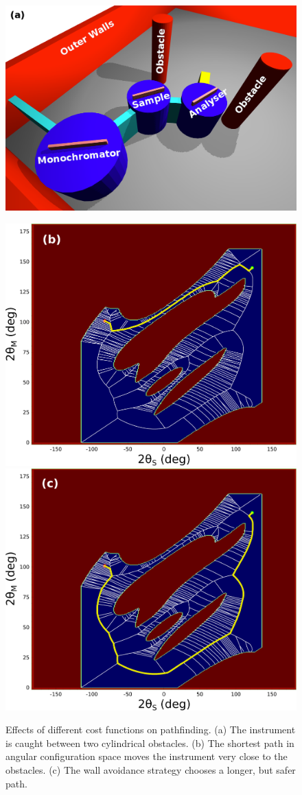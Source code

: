 \begin{figure}[h]
	\begin{center}
		\includegraphics[width = 0.66 \textwidth]{figures/strategies_instrument}

		\vspace{0.1cm}
		\includegraphics[width = 0.49 \textwidth]{figures/strategies_shortest_path}
		\hspace{0.1cm}
		\includegraphics[width = 0.49 \textwidth]{figures/strategies_avoid_walls}
	\end{center}
	\caption[Pathfinding strategies.]{
		Effects of different cost functions on pathfinding.
		(a) The instrument is caught between two cylindrical obstacles.
		(b) The shortest path in angular configuration space moves the instrument very close to the obstacles.
		(c) The wall avoidance strategy chooses a longer, but safer path.
		\label{fig:path_finding_strategies}}
\end{figure}


